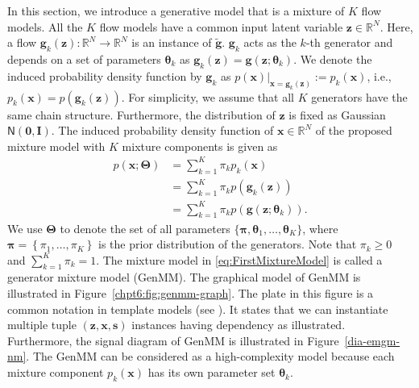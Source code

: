 In this section, we introduce a generative model that is a mixture of $K$ flow models. All the $K$ flow models have a common input latent variable $\bm{z} \in \mathbb{R}^N$. Here, a flow $\bm{g}_k(\bm{z}): \mathbb{R}^N
\rightarrow \mathbb{R}^N$ is an instance of $\tilde{\bm{g}}$. $\bm{g}_k$ acts as the $k$-th generator and depends on a set of parameters $\bm{\theta}_k$ as
$\bm{g}_k(\bm{z})=\bm{g}(\bm{z};\boldsymbol{\theta}_k)$. We denote the induced probability density function by $\bm{g}_k$ as $p(\bm{x})|_{\bm{x}=\bm{g}_k(\bm{z})}:=p_k(\bm{x})$, i.e., $p_k(\bm{x})=p(\bm{g}_k(\bm{z}))$. For simplicity, we assume that all $K$ generators have the same chain structure. Furthermore, the distribution of $\bm{z}$ is fixed as Gaussian $\mathsf{N}(\bm{0},\bm{I})$.
The induced probability density function of $\bm{x} \in \mathbb{R}^N$ of the proposed mixture model with $K$ mixture components is given as
\begin{align}\label{eq:FirstMixtureModel}
  p(\bm{x};\bm{\Theta})  &= \textstyle\sum_{k=1}^K \pi_k  p_k(\bm{x}) \nonumber\\
                         &= \textstyle \sum_{k=1}^K \pi_k  p(\bm{g}_k(\bm{z}))\nonumber\\
                         &= \textstyle \sum_{k=1}^K \pi_k  p(\bm{g}(\bm{z};\boldsymbol{\theta}_k)).
\end{align}
We use $\bm{\Theta}$ to denote the set of all parameters $ \{\bm{\pi},\bm{\theta}_1, \dots, \bm{\theta}_K \}$, where $\bm{\pi} = \left\{ \pi_1, \hdots, \pi_K \right\}$ is the prior distribution of the generators. Note that $\pi_k \geq 0$ and $\sum_{k=1}^K \pi_k =1$. The mixture model
in \eqref{eq:FirstMixtureModel} is called a generator mixture model (GenMM). The graphical model of GenMM is illustrated in Figure~\ref{chpt6:fig:genmm-graph}. The plate in this figure is a common notation in template models (see \cite[Section~6]{koller2009pgm}). It states that  we can instantiate multiple tuple $(\bm{z}, \bm{x}, \bm{s})$ instances having dependency as illustrated. Furthermore, the
signal diagram of GenMM is illustrated in Figure~\ref{dia-emgm-nm}. The GenMM can be considered as a high-complexity model because each mixture component $p_k(\bm{x})$ has its own parameter set $\bm{\theta}_k$. 

